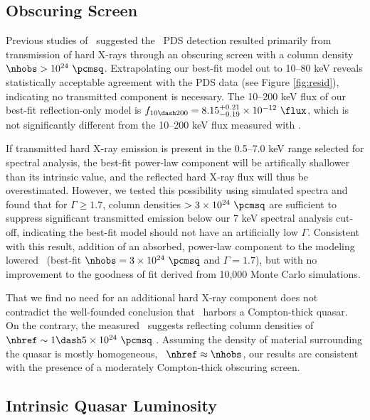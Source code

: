 \documentclass[useAMS,usenatbib]{mn2e}
\begin{document}
\subsection{Obscuring Screen}

Previous studies of \irs\ suggested the \bepposax\ PDS detection
resulted primarily from transmission of hard X-rays through an
obscuring screen with a column density $\nhobs > 10^{24}
~\pcmsq$. Extrapolating our best-fit model out to 10--80 keV reveals
statistically acceptable agreement with the PDS data (see Figure
\ref{fig:resid}), indicating no transmitted component is
necessary. The 10--200 keV flux of our best-fit reflection-only model
is $f_{10 \dash 200} = 8.15^{+0.21}_{-0.19} \times 10^{-12} ~\flux$,
which is not significantly different from the 10--200 keV flux
measured with \bepposax.

If transmitted hard X-ray emission is present in the 0.5--7.0 keV
range selected for spectral analysis, the best-fit power-law component
will be artifically shallower than its intrinsic value, and the
reflected hard X-ray flux will thus be overestimated. However, we
tested this possibility using simulated spectra and found that for
$\Gamma \ge 1.7$, column densities $> 3 \times 10^{24} ~\pcmsq$ are
sufficient to suppress significant transmitted emission below our 7
keV spectral analysis cut-off, indicating the best-fit model should
not have an artificially low $\Gamma$. Consistent with this result,
addition of an absorbed, power-law component to the modeling lowered
\chisq\ (best-fit $\nhobs = 3 \times 10^{24} ~\pcmsq$ and $\Gamma =
1.7$), but with no improvement to the goodness of fit derived from
10,000 Monte Carlo simulations.

That we find no need for an additional hard X-ray component does not
contradict the well-founded conclusion that \irs\ harbors a
Compton-thick quasar. On the contrary, the measured \fekaew\ suggests
reflecting column densities of $\nhref \sim 1 \dash 5 \times 10^{24}
~\pcmsq$ \citep{1993MNRAS.263..314L, 2005A&A...444..119G,
  2010arXiv1005.3253C}. Assuming the density of material surrounding
the quasar is mostly homogeneous, \ie\ $\nhref \approx \nhobs$, our
results are consistent with the presence of a moderately Compton-thick
obscuring screen.

\subsection{Intrinsic Quasar Luminosity}
\end{document}
